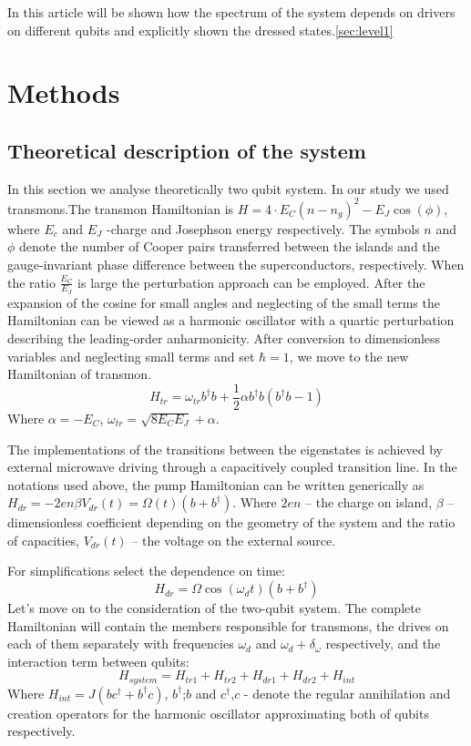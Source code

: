 \documentclass[%
 aip,
 amsmath,amssymb,
 reprint,%
]{revtex4-1}
\begin{document}
In this article will be shown how the spectrum of the system depends on drivers on different qubits and explicitly shown the dressed states.\autoref{sec:level1}
 
\section{Methods}
\subsection{Theoretical description of the system}
In this section we analyse theoretically two qubit system.
 In our study we used transmons.The transmon Hamiltonian is $H = 4\cdot E_C(n-n_g)^2 -E_J\cos(\phi)$, where $E_c $ and $E_J$ -charge and Josephson energy respectively. The symbols $n$ and $\phi$ denote the number of Cooper pairs transferred between the islands and the
 gauge-invariant phase difference between the superconductors,
 respectively.
 When the ratio $\frac{E_C}{E_J}$ is large the perturbation approach can
 be employed. After the expansion of the cosine for small angles and neglecting of the small terms the Hamiltonian can be
 viewed as a harmonic oscillator with a quartic perturbation describing the leading-order anharmonicity.
 After conversion to dimensionless variables and neglecting small terms and set $\hbar = 1$, we move to the new Hamiltonian of transmon. 
\begin{equation}
H_{tr}= \omega_{tr} b^{\dagger}b +\frac{1}{2}\alpha b^{\dagger}b(b^{\dagger}b-1)
\end{equation}
Where $\alpha=-E_C$, $\omega_{tr}=\sqrt{8E_CE_J}+\alpha$.


The implementations of the transitions between the eigenstates is achieved by external microwave driving through a capacitively coupled transition line. In the notations used above, the pump Hamiltonian can be written generically as $ 	H_{dr} = -2e n\beta V_{dr}(t)=\Omega(t)(b+b^{\dagger})$.
Where $2en$ -- the charge on island, $\beta$ -- dimensionless coefficient depending on the geometry of the system and the ratio of capacities, $V_{dr}(t)$ -- the voltage on the external source.

For simplifications select the dependence on time:
\begin{equation}
H_{dr} = \Omega\cos(\omega_d t)(b+b^{\dagger})
\end{equation}
Let's move on to the consideration of the two-qubit system. The complete Hamiltonian will contain the members responsible for transmons, the drives on each of them separately with frequencies $\omega_d$ and $\omega_d+\delta_{\omega}$ respectively, and the interaction term between qubits:
\begin{equation}
H_{system}= H_{tr1}+H_{tr2}+H_{dr1}+H_{dr2}+H_{int}
\end{equation}
Where $H_{int}= J(bc^{\dagger}+b^{\dagger}c)$, $b^{\dagger}$;$b$ and $c^{\dagger}$,$c$ - denote the regular annihilation and creation operators
for the harmonic oscillator approximating both of qubits respectively.
\end{document}
